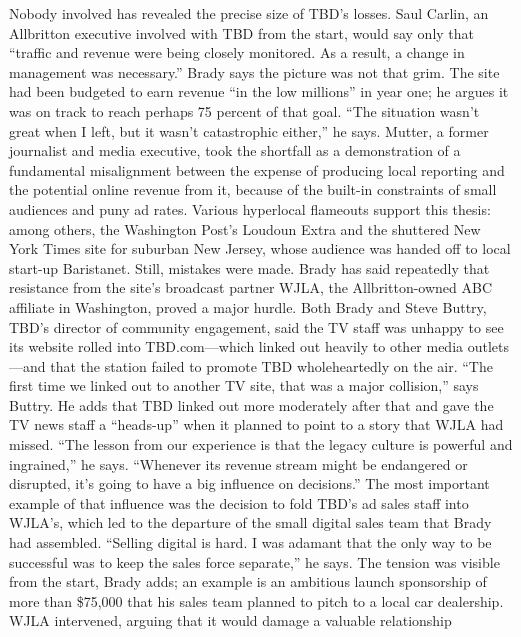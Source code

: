 Nobody involved has revealed the precise size of TBD’s losses. Saul Carlin, an
Allbritton executive involved with TBD from the start, would say only that ``traffic
and revenue were being closely monitored. As a result, a change in management
was necessary.''
Brady says the picture was not that grim. The site had been budgeted to earn
revenue ``in the low millions'' in year one; he argues it was on track to reach perhaps
75 percent of that goal. ``The situation wasn’t great when I left, but it wasn’t
catastrophic either,'' he says.
Mutter, a former journalist and media executive, took the shortfall as a demonstration
of a fundamental misalignment between the expense of producing
local reporting and the potential online revenue from it, because of the built-in
constraints of small audiences and puny ad rates. Various hyperlocal flameouts
support this thesis: among others, the Washington Post’s Loudoun Extra and the
shuttered New York Times site for suburban New Jersey, whose audience was
handed off to local start-up Baristanet.
Still, mistakes were made. Brady has said repeatedly that resistance from the
site’s broadcast partner WJLA, the Allbritton-owned ABC affiliate in Washington,
proved a major hurdle. Both Brady and Steve Buttry, TBD’s director of community
engagement, said the TV staff was unhappy to see its website rolled into
TBD.com—which linked out heavily to other media outlets—and that the station
failed to promote TBD wholeheartedly on the air.
``The first time we linked out to another TV site, that was a major collision,''
says Buttry. He adds that TBD linked out more moderately after that and gave the
TV news staff a ``heads-up'' when it planned to point to a story that WJLA had
missed. ``The lesson from our experience is that the legacy culture is powerful
and ingrained,'' he says. ``Whenever its revenue stream might be endangered or
disrupted, it’s going to have a big influence on decisions.''
The most important example of that influence was the decision to fold TBD’s
ad sales staff into WJLA’s, which led to the departure of the small digital sales
team that Brady had assembled. ``Selling digital is hard. I was adamant that the
only way to be successful was to keep the sales force separate,'' he says. The tension
was visible from the start, Brady adds; an example is an ambitious launch
sponsorship of more than \$75,000 that his sales team planned to pitch to a local
car dealership. WJLA intervened, arguing that it would damage a valuable relationship
